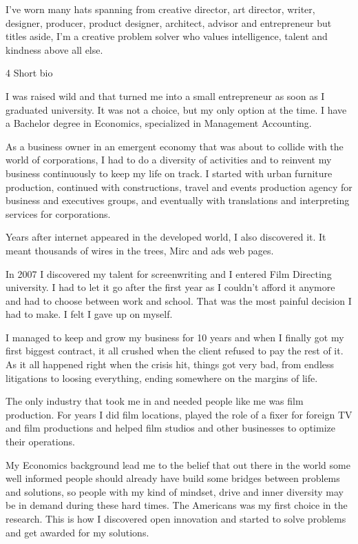 \documentclass[12pt, titlepage]{article}
\begin{document}
I've worn many hats spanning from creative director, art director,
writer, designer, producer, product designer, architect, advisor and
entrepreneur but titles aside, I'm a creative problem solver who values
intelligence, talent and kindness above all else.

4 Short bio

I was raised wild and that turned me into a small entrepreneur as soon
as I graduated university. It was not a choice, but my only option at
the time. I have a Bachelor degree in Economics, specialized in
Management Accounting.

As a business owner in an emergent economy that was about to collide
with the world of corporations, I had to do a diversity of activities
and to reinvent my business continuously to keep my life on track. I
started with urban furniture production, continued with constructions,
travel and events production agency for business and executives groups,
and eventually with translations and interpreting services for
corporations.

Years after internet appeared in the developed world, I also discovered
it. It meant thousands of wires in the trees, Mirc and ads web pages.

In 2007 I discovered my talent for screenwriting and I entered Film
Directing university. I had to let it go after the first year as I
couldn't afford it anymore and had to choose between work and school.
That was the most painful decision I had to make. I felt I gave up on
myself.

I managed to keep and grow my business for 10 years and when I finally
got my first biggest contract, it all crushed when the client refused to
pay the rest of it. As it all happened right when the crisis hit, things
got very bad, from endless litigations to loosing everything, ending
somewhere on the margins of life.

The only industry that took me in and needed people like me was film
production. For years I did film locations, played the role of a fixer
for foreign TV and film productions and helped film studios and other
businesses to optimize their operations.

My Economics background lead me to the belief that out there in the
world some well informed people should already have build some bridges
between problems and solutions, so people with my kind of mindset, drive
and inner diversity may be in demand during these hard times. The
Americans was my first choice in the research. This is how I discovered
open innovation and started to solve problems and get awarded for my
solutions.
\end{document}
